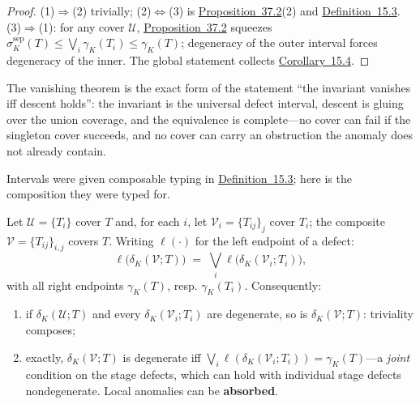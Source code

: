 \begin{proof}

(1)\(\Rightarrow\)(2) trivially; (2)\(\Leftrightarrow\)(3) is \hyperlink{stmt:37.2}{Proposition~37.2}(2) and \hyperlink{stmt:15.3}{Definition~15.3}. (3)\(\Rightarrow\)(1): for any cover \(\mathcal{U}\), \hyperlink{stmt:37.2}{Proposition~37.2} squeezes \(\sigma^{\mathrm{sep}}_K(T) \le \bigvee_i \gamma_K(T_i) \le \gamma_K(T)\); degeneracy of the outer interval forces degeneracy of the inner. The global statement collects \hyperlink{stmt:15.4}{Corollary~15.4}.
\end{proof}

The vanishing theorem is the exact form of the statement ``the invariant vanishes iff descent holds'': the invariant is the universal defect interval, descent is gluing over the union coverage, and the equivalence is complete---\hspace{0pt}no cover can fail if the singleton cover succeeds, and no cover can carry an obstruction the anomaly does not already contain.


Intervals were given composable typing in \hyperlink{stmt:15.3}{Definition~15.3}; here is the composition they were typed for.

\begin{thmplain}

Let \(\mathcal{U} = \{T_i\}\) cover \(T\) and, for each \(i\), let \(\mathcal{V}_i = \{T_{ij}\}_j\) cover \(T_i\); the composite \(\mathcal{V} = \{T_{ij}\}_{i,j}\) covers \(T\). Writing \(\ell(\cdot)\) for the left endpoint of a defect:
\[
\ell\big(\delta_K(\mathcal{V}; T)\big) \;=\; \bigvee_i \ell\big(\delta_K(\mathcal{V}_i; T_i)\big),
\]
with all right endpoints \(\gamma_K(T)\), resp. \(\gamma_K(T_i)\). Consequently:

\begin{enumerate}
\def\labelenumi{\arabic{enumi}.}
\tightlist
\item
  if \(\delta_K(\mathcal{U}; T)\) and every \(\delta_K(\mathcal{V}_i; T_i)\) are degenerate, so is \(\delta_K(\mathcal{V}; T)\): triviality composes;
\item
  exactly, \(\delta_K(\mathcal{V}; T)\) is degenerate iff \(\bigvee_i \ell(\delta_K(\mathcal{V}_i; T_i)) = \gamma_K(T)\)---\hspace{0pt}a \emph{joint} condition on the stage defects, which can hold with individual stage defects nondegenerate. Local anomalies can be \textbf{absorbed}.
\end{enumerate}
\end{thmplain}

